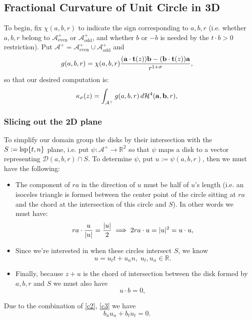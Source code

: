 \documentclass{article}
\newcommand{\aeven}{\mathcal{A}_{\mathrm{even}}^+}
\newcommand{\aodd}{\mathcal{A}_{\mathrm{odd}}^+}
\newcommand{\bec}[1]{\mathbf{#1}}
\newcommand{\lsp}[1]{\mathrm{lsp}\braces{#1}}
\begin{document}
\subsection{Fractional Curvature of Unit Circle in 3D}%
To begin, fix $\chi(a,b,r)$ to indicate the sign corresponding to $a, b, r$ (i.e. whether $a, b, r$ belong to $\aeven$ or $\aodd$, and whether $b$ or $-b$ is needed by the $t \cdot b > 0$ restriction). Put $\mathcal{A}^+ = \aeven \cup \aodd$ and
$$
g(a, b, r) = \chi(a, b, r) \frac{\parens{\bec{a} \cdot \bec{t}(z)} \bec{b} - \parens{\bec{b} \cdot \bec{t}(z)}\bec{a}}{r^{1+\sigma}},
$$
so that our desired computation is:
$$
\kappa_\sigma(z) = \int_{\mathcal{A}^+} g(a, b, r) \, d\mathcal{H}^{4}\parens{\bec{a}, \bec{b}, r},
$$

\subsubsection{Slicing out the 2D plane}%
To simplify our domain group the disks by their intersection with the $S := \lsp{t, n}$ plane, i.e. put $\psi : \mathcal{A}^+ \to \mathbb{R}^2$ so that $\psi$ maps a disk to a vector representing $\mathcal{D}(a, b, r) \cap S$. To determine $\psi$, put $u := \psi(a, b, r)$, then we must have the following:
\begin{itemize}
  \item The component of $ra$ in the direction of $u$ must be half of $u$'s length (i.e. an isoceles triangle is formed between the center point of the circle sitting at $ra$ and the chord at the intersection of this circle and $S$). In other words we must have:
    \begin{equation}
      ra \cdot \frac{u}{\lvert u\rvert} = \frac{\lvert u\rvert}{2} \implies 2 ra \cdot u = \lvert u\rvert^2 = u\cdot u, \label{c1}
    \end{equation}
  \item Since we're interested in when these circles intersect $S$, we know
    \begin{equation}
      u = u_t t + u_n n, \; u_t, u_n \in \mathbb{R}. \label{c3}
    \end{equation}
  \item Finally, because $z + u$ is the chord of intersection between the disk formed by $a, b, r$ and $S$ we must also have
    \begin{equation}
      u \cdot b = 0, \label{c2}
    \end{equation}
\end{itemize}
Due to the combination of \eqref{c2}, \eqref{c3} we have
$$
  b_n u_n + b_t u_t = 0.
$$
\end{document}
